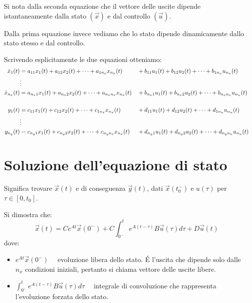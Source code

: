 \documentclass[../main.tex]{subfiles}
\begin{document}
		Si nota dalla seconda equazione che il vettore delle uscite dipende istantaneamente dalla stato $ (\vec x) $ e dal controllo $ (\vec u) $.
		
		Dalla prima equazione invece vediamo che lo stato dipende dinamicamente dallo stato stesso e dal controllo.
		
		Scrivendo esplicitamente le due equazioni otteniamo:
		\newcommand{\eq}[3]{#2_{#3 1} #1_1(t) + #2_{#3 2} #1_2(t) + \cdots + #2_{#3 n_#1} #1_{n_#1}(t)}
		\begin{align*}
			\dot x_1(t) &= \eq{x}{a}{1} && + \eq{u}{b}{1}\\
			&\vdots\\
			\dot x_{n_x}(t) &= \eq{x}{a}{n_x} && + \eq{u}{b}{n_x}\\
			\smallskip\\
			y_1(t) &= \eq{x}{c}{1} && + \eq{u}{d}{1}\\
			&\vdots\\
			y_{n_y}(t) &= \eq{x}{c}{n_y} && + \eq{u}{d}{n_y}\\
		\end{align*}
		
	\section{Soluzione dell'equazione di stato}
		Significa trovare $ \vec x(t) $ e di conseguenza $ \vec y(t) $, dati $ \vec x(t_0^-) $ e $ u(\tau) $ per $ \tau \in [0, t_0] $.
		
		Si dimostra che:
		\[
			\vec x(t) = C e^{At} \vec x(0^-) + C \int_{0^-}^{t} e^{A(t-\tau)} B \vec u(\tau) d\tau + D \vec u(t)
		\]
		dove:
		\begin{itemize}
			\item 
				$ e^{At} \vec x(0^-) \quad $ evoluzione libera dello stato. \'E l'uscita che dipende solo dalle $ n_x $ condizioni iniziali, pertanto si chiama vettore delle uscite libere.
			\item
				$ \int_{0^-}^{t} e^{A(t-\tau)} B \vec u(\tau) d\tau \quad $ integrale di convoluzione che rappresenta l'evoluzione forzata dello stato.
		\end{itemize}
	
\end{document}

